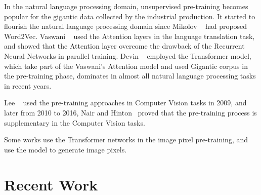 \documentclass[10pt,twocolumn,letterpaper]{article}
\begin{document}
  In the natural language processing domain, unsupervised pre-training becomes popular for the gigantic data collected by the industrial production.
  It started to flourish the natural language processing domain since Mikolov \etal~\cite{mikolov2013distributed} had proposed Word2Vec.
  Vaswani \etal~\cite{vaswani2017attention} used the Attention layers in the language translation task, and showed that the Attention layer overcome the drawback of the Recurrent Neural Networks
in parallel training. Devin \etal~\cite{devlin2019bert} employed the Transformer model, which take part of the Vaswani's Attention model and used Gigantic corpus in the pre-training phase, dominates in almost all natural language processing tasks in recent years.

  Lee \etal~\cite{lee2009convolutional} used the pre-training approaches in Computer Vision tasks in 2009, and later from 2010 to 2016,
  Nair and Hinton~\cite{nair2010rectified} proved that the pre-training process is supplementary in the Computer Vision tasks.

  Some works use the Transformer networks in the image pixel pre-training, and use the model to generate image pixels.


\section{Recent Work}
\end{document}
